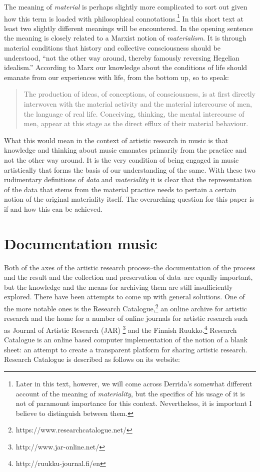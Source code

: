 \documentclass[11pt,a4paper]{article}
\begin{document}
The meaning of \emph{material} is perhaps slightly more complicated to sort out given how this term is loaded with philosophical connotations.\footnote{Later in this text, however, we will come across Derrida's somewhat different account of the meaning of \emph{materiality}, but the specifics of his usage of it is not of paramount importance for this context. Nevertheless, it is important I believe to distinguish between them.} In this short text at least two slightly different meanings will be encountered. In the opening sentence the meaning is closely related to a Marxist notion of \emph{materialism}. It is through material conditions that history and collective consciousness should be understood, ``not the other way around, thereby famously reversing Hegelian idealism.'' \citep[p. 25]{beetz2016} According to Marx our knowledge about the conditions of life should emanate from our experiences with life, from the bottom up, so to speak:
\begin{quote}
  The production of ideas, of conceptions, of consciousness, is at first directly interwoven with the material activity and the material intercourse of men, the language of real life. Conceiving, thinking, the mental intercourse of men, appear at this stage as the direct efflux of their material behaviour. \citep[p. 47]{marx1970}
\end{quote}
What this would mean in the context of artistic research in music is that knowledge and thinking about music emanates primarily from the practice and not the other way around. It is the very condition of being engaged in music artistically that forms the basis of our understanding of the same. With these two rudimentary definitions of \emph{data} and \emph{materiality} it is clear that the representation of the data that stems from the material practice needs to pertain a certain notion of the original materiality itself. The overarching question for this paper is if and how this can be achieved.

\section*{Documentation music}
\label{sec:docum-datab}

Both of the axes of the artistic research process--the documentation of the process and the result and the collection and preservation of data--are equally important, but the knowledge and the means for archiving them are still insufficiently explored. There have been attempts to come up with general solutions. One of the more notable ones is the Research Catalogue,\footnote{https://www.researchcatalogue.net/} an online archive for artistic research and the home for a number of online journals for artistic research such as Journal of Artistic Research (JAR) \footnote{http://www.jar-online.net/} and the Finnish Ruukko.\footnote{http://ruukku-journal.fi/en} Research Catalogue is an online based computer implementation of the notion of a blank sheet: an attempt to create a transparent platform for sharing artistic research. Research Catalogue is described as follows on its website:
\end{document}

